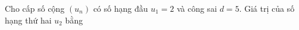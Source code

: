 \begin{ex}
Cho cấp số cộng $(u_n)$ có số hạng đầu $u_1=2$ và công sai $d=5$. Giá trị của số hạng thứ hai $u_2$ bằng
\end{ex}

